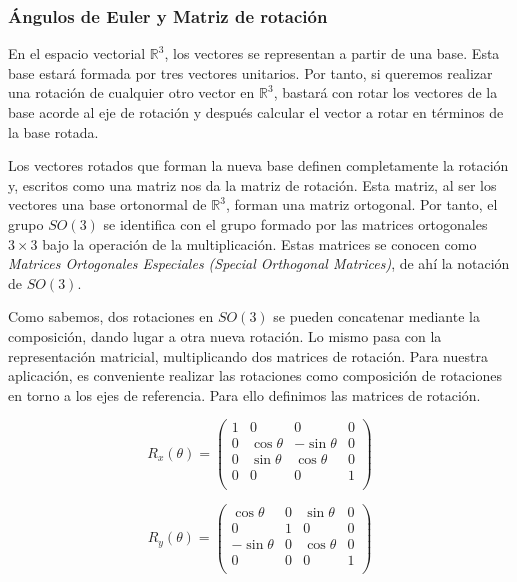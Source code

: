 \subsubsection{Ángulos de Euler y Matriz de rotación}
\label{makereference5.4.2.1}

En el espacio vectorial $\mathbb{R}^3$, los vectores se representan a partir de
una base. Esta base estará formada por tres vectores unitarios. Por tanto, si
queremos realizar una rotación de cualquier otro vector en $\mathbb{R}^3$,
bastará con rotar los vectores de la base acorde al eje de rotación y después
calcular el vector a rotar en términos de la base rotada. 

Los vectores rotados que forman la nueva base definen completamente la rotación
y, escritos como una matriz nos da la matriz de rotación. Esta matriz, al ser
los vectores una base ortonormal de $\mathbb{R}^3$, forman una matriz ortogonal.
Por tanto, el grupo $SO(3)$ se identifica con el grupo formado por las matrices
ortogonales $3\times 3$ bajo la operación de la multiplicación. Estas matrices
se conocen como \textit{Matrices Ortogonales Especiales (Special Orthogonal
Matrices)}, de ahí la notación de $SO(3)$. 

Como sabemos, dos rotaciones en $SO(3)$ se pueden concatenar mediante la
composición, dando lugar a otra nueva rotación. Lo mismo pasa con la
representación matricial, multiplicando dos matrices de rotación. Para nuestra
aplicación, es conveniente realizar las rotaciones como composición de
rotaciones en torno a los ejes de referencia. Para ello definimos las matrices
de rotación. 

\begin{equation}
	R_x(\theta) =
	\left(	
		\begin{array}{cccc}
			1 & 0 & 0 & 0 \\				
			0 & \cos{\theta} & -\sin{\theta} & 0 \\				
			0 & \sin{\theta} & \cos{\theta} & 0 \\				
			0 & 0 & 0 & 1 \\				
		\end{array}
	\right)
\end{equation}

\begin{equation}
	R_y(\theta) =
	\left(	
		\begin{array}{cccc}
			\cos{\theta} & 0 & \sin{\theta} & 0 \\				
			0 & 1 & 0 & 0 \\				
			-\sin{\theta} & 0 & \cos{\theta} & 0 \\				
			0 & 0 & 0 & 1 \\				
		\end{array}
	\right)
\end{equation}

